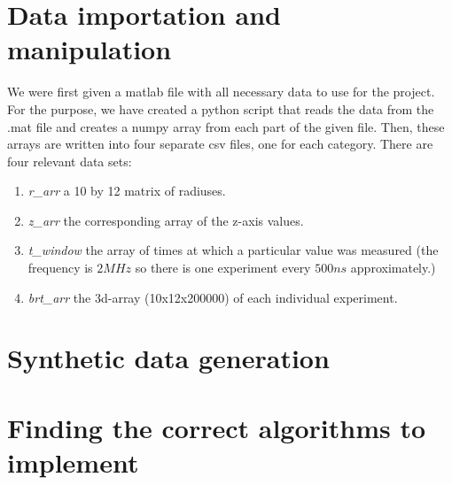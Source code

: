 \documentclass[10pt,conference,compsocconf]{IEEEtran}
\begin{document}
\section{Data importation and manipulation}
We were first given a matlab file with all necessary data to use for the project. For the purpose, we have created a python script that reads the data from the .mat file and creates a numpy array from each part of the given file. Then, these arrays are written into four separate csv files, one for each category. There are four relevant data sets:
\begin{enumerate}
  \item \textit{r\_arr} a 10 by 12 matrix of radiuses.
  \item \textit{z\_arr} the corresponding array of the z-axis values.
  \item \textit{t\_window} the array of times at which a particular value was measured (the frequency is $2MHz$ so there is one experiment every $500ns$ approximately.)
  \item \textit{brt\_arr} the 3d-array (10x12x200000) of each individual experiment.
\end{enumerate}

\section{Synthetic data generation}

\section{Finding the correct algorithms to implement}



\end{document}
